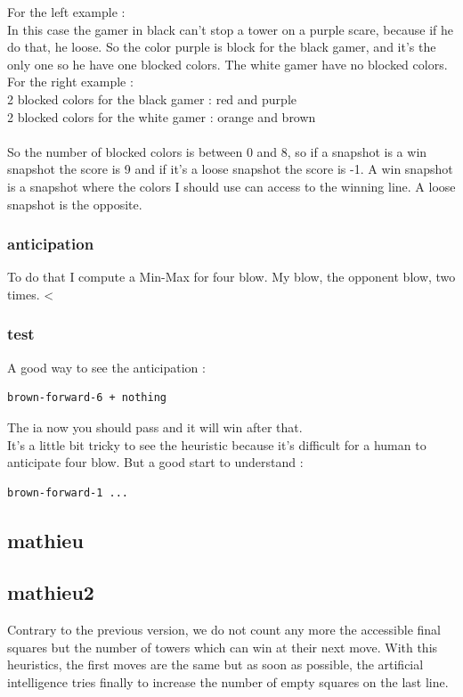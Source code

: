 \documentclass[a4paper, 11pt]{article}
\begin{document}
For the left example :\\
In this case the gamer in black can't stop a tower on a purple scare, because if he do that, he loose. So the color purple is block for the black gamer, and it's the only one so he have one blocked colors. The white gamer have no blocked colors.\\
For the right example :\\
2 blocked colors for the black gamer : red and purple\\
2 blocked colors for the white gamer : orange and brown\\\\
So the number of blocked colors is between 0 and 8, so if a snapshot is a win snapshot the score is 9 and if it's a loose snapshot the score is -1. A win snapshot is a snapshot where the colors I should use can access to the winning line. A loose snapshot is the opposite.

\subsubsection{anticipation}
To do that I compute a Min-Max for four blow. My blow, the opponent blow, two times.
<
\subsubsection{test}
A good way to see the anticipation :
\begin{verbatim}
brown-forward-6 + nothing
\end{verbatim}
The ia now you should pass and it will win after that.\\

It's a little bit tricky to see the heuristic because it's difficult for a human to anticipate four blow. But a good start to understand :
\begin{verbatim}
brown-forward-1 ...
\end{verbatim}

\subsection{mathieu}


\subsection{mathieu2}
Contrary to the previous version, we do not count any more the accessible final squares but the number of towers which can win at their next move. 
With this heuristics, the first moves are the same but as soon as possible, the artificial intelligence tries finally to increase the number of empty squares on the last line.
\end{document}
